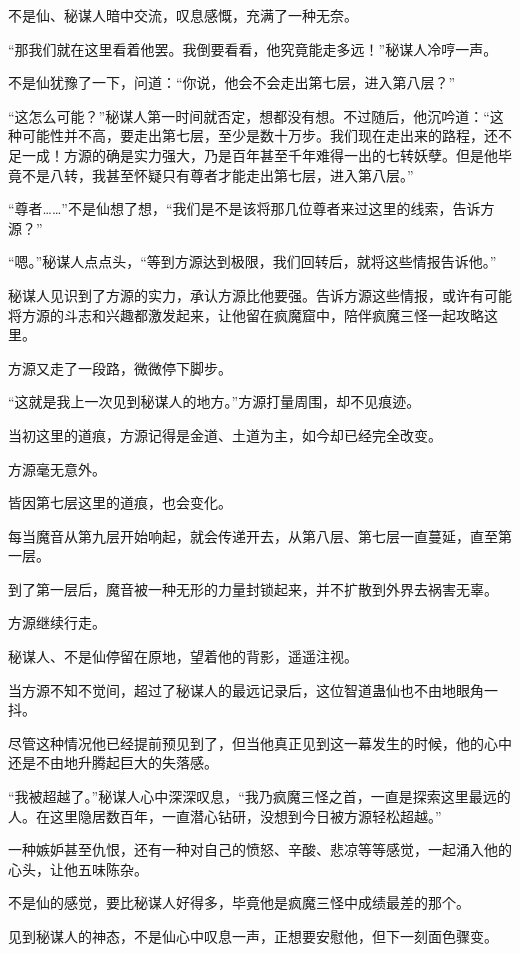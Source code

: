 \begin{this_body}
不是仙、秘谋人暗中交流，叹息感慨，充满了一种无奈。

“那我们就在这里看着他罢。我倒要看看，他究竟能走多远！”秘谋人冷哼一声。

不是仙犹豫了一下，问道：“你说，他会不会走出第七层，进入第八层？”

“这怎么可能？”秘谋人第一时间就否定，想都没有想。不过随后，他沉吟道：“这种可能性并不高，要走出第七层，至少是数十万步。我们现在走出来的路程，还不足一成！方源的确是实力强大，乃是百年甚至千年难得一出的七转妖孽。但是他毕竟不是八转，我甚至怀疑只有尊者才能走出第七层，进入第八层。”

“尊者……”不是仙想了想，“我们是不是该将那几位尊者来过这里的线索，告诉方源？”

“嗯。”秘谋人点点头，“等到方源达到极限，我们回转后，就将这些情报告诉他。”

秘谋人见识到了方源的实力，承认方源比他要强。告诉方源这些情报，或许有可能将方源的斗志和兴趣都激发起来，让他留在疯魔窟中，陪伴疯魔三怪一起攻略这里。

方源又走了一段路，微微停下脚步。

“这就是我上一次见到秘谋人的地方。”方源打量周围，却不见痕迹。

当初这里的道痕，方源记得是金道、土道为主，如今却已经完全改变。

方源毫无意外。

皆因第七层这里的道痕，也会变化。

每当魔音从第九层开始响起，就会传递开去，从第八层、第七层一直蔓延，直至第一层。

到了第一层后，魔音被一种无形的力量封锁起来，并不扩散到外界去祸害无辜。

方源继续行走。

秘谋人、不是仙停留在原地，望着他的背影，遥遥注视。

当方源不知不觉间，超过了秘谋人的最远记录后，这位智道蛊仙也不由地眼角一抖。

尽管这种情况他已经提前预见到了，但当他真正见到这一幕发生的时候，他的心中还是不由地升腾起巨大的失落感。

“我被超越了。”秘谋人心中深深叹息，“我乃疯魔三怪之首，一直是探索这里最远的人。在这里隐居数百年，一直潜心钻研，没想到今日被方源轻松超越。”

一种嫉妒甚至仇恨，还有一种对自己的愤怒、辛酸、悲凉等等感觉，一起涌入他的心头，让他五味陈杂。

不是仙的感觉，要比秘谋人好得多，毕竟他是疯魔三怪中成绩最差的那个。

见到秘谋人的神态，不是仙心中叹息一声，正想要安慰他，但下一刻面色骤变。


\end{this_body}
